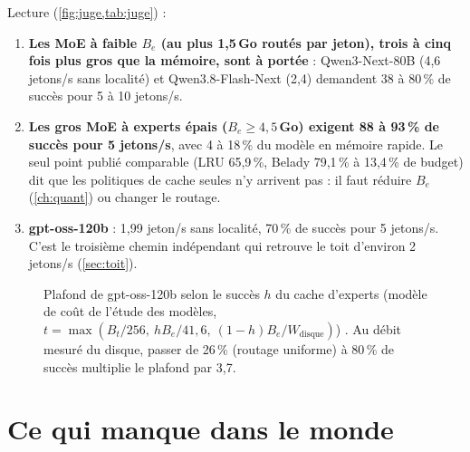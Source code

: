 Lecture (\cref{fig:juge,tab:juge}) :
\begin{enumerate}
\item \textbf{Les MoE à faible $B_e$ (au plus 1,5\,Go routés par jeton), trois à cinq fois plus gros que la mémoire, sont à portée} : Qwen3-Next-80B (4,6 jetons/s sans localité) et Qwen3.8-Flash-Next (2,4) demandent 38 à 80\,\% de succès pour 5 à 10 jetons/s.
\item \textbf{Les gros MoE à experts épais ($B_e \ge 4{,}5$\,Go) exigent 88 à 93\,\% de succès pour 5 jetons/s}, avec 4 à 18\,\% du modèle en mémoire rapide. Le seul point publié comparable (LRU 65,9\,\%, Belady 79,1\,\% à 13,4\,\% de budget) dit que les politiques de cache seules n'y arrivent pas : il faut réduire $B_e$ (\cref{ch:quant}) ou changer le routage.
\item \textbf{gpt-oss-120b} : 1,99 jeton/s sans localité, 70\,\% de succès pour 5 jetons/s. C'est le troisième chemin indépendant qui retrouve le toit d'environ 2 jetons/s (\cref{sec:toit}).
\end{enumerate}

\begin{figure}[ht]
\centering
\GrapheSensibiliteH
\caption[Le plafond de gpt-oss-120b selon le succès du cache]{Plafond de gpt-oss-120b selon le succès $h$ du cache d'experts (modèle de coût de l'étude des modèles, $t = \max(B_t/256,\ hB_e/41{,}6,\ (1-h)B_e/W_{\mathrm{disque}})$) \calc. Au débit mesuré du disque, passer de 26\,\% (routage uniforme) à 80\,\% de succès multiplie le plafond par 3,7.}
\label{fig:sensibilite-h}
\end{figure}

\section{Ce qui manque dans le monde}\label{sec:trous-chargement}

